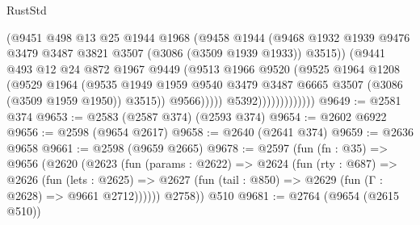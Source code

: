 \begin{lexlean}{RustStd}
\begin{coremodule}
                                (@9451
                                  @498
                                  @13
                                  @25
                                  @1944
                                  @1968
                                  (@9458
                                    @1944
                                    (@9468
                                      @1932
                                      @1939
                                      @9476
                                      @3479
                                      @3487
                                      @3821
                                      @3507
                                      (@3086 (@3509 @1939 @1933))
                                      @3515))
                                  (@9441
                                    @493
                                    @12
                                    @24
                                    @872
                                    @1967
                                    @9449
                                    (@9513
                                      @1966
                                      @9520
                                      (@9525
                                        @1964
                                        @1208
                                        (@9529
                                          @1964
                                          (@9535
                                            @1949
                                            @1959
                                            @9540
                                            @3479
                                            @3487
                                            @6665
                                            @3507
                                            (@3086 (@3509 @1959 @1950))
                                            @3515))
                                        @9566)))))
                              @5392)))))))))))))
@9649 := @2581 @374
@9653 := @2583 (@2587 @374) (@2593 @374)
@9654 := @2602 @6922
@9656 := @2598 (@9654 @2617)
@9658 := @2640 (@2641 @374)
@9659 := @2636 @9658
@9661 := @2598 (@9659 @2665)
@9678 := @2597
    (fun (fn : @35) =>
    @9656
      (@2620
        (@2623
          (fun (params : @2622) =>
          @2624
            (fun (rty : @687) =>
            @2626
              (fun (lets : @2625) =>
              @2627 (fun (tail : @850) => @2629 (fun (Γ : @2628) => @9661 @2712))))))
        @2758))
    @510
@9681 := @2764 (@9654 (@2615 @510))

\end{coremodule}
\end{lexlean}

